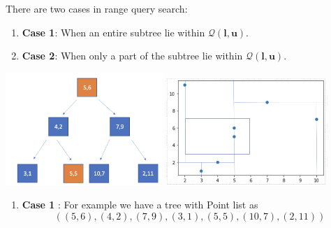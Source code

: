 There are two cases in range query search:
\begin{enumerate}
    \item\textbf{Case 1}: When an entire subtree lie within $\mathcal{Q}(\boldsymbol{l}, \boldsymbol{u})$.
    \item\textbf{Case 2}: When only a part of the subtree lie within $\mathcal{Q}(\boldsymbol{l}, \boldsymbol{u})$.
\end{enumerate}

\begin{mscexample}

    
    \begin{minipage}[t]{\linewidth}
    \centering
    \includegraphics[width=6cm]{graphs/Range_Query_Tree.png}
    \label{fig:KD-Tree_for_Range Query}
    \hfill
    \includegraphics[width=6cm]{graphs/Range_Query_plot.png}
    \label{fig:KD_Tree_Range_Query_Plot}
    \end{minipage}


    
\begin{enumerate}
    \item\textbf{Case 1} : For example we have a tree with Point list as 
	$$((5,6),(4,2),(7,9),(3,1),(5,5),(10,7),(2,11))$$
	

\end{enumerate}
\end{mscexample}
